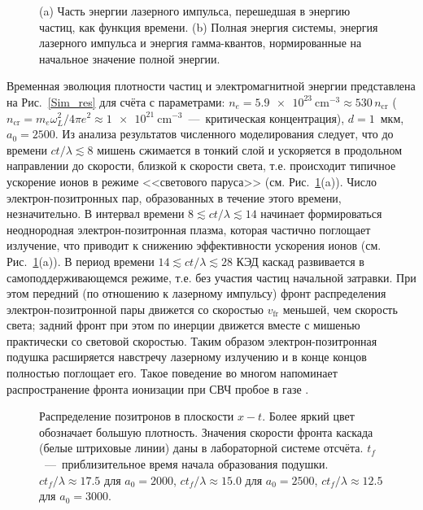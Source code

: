 \begin{figure}[h!]
	\caption[Баланс энергии в системе в численном моделировании с параметрами $n_{e}=\SI{5.9e23}{\centi\meter^{-3}}$, $d=1$~мкм, $a_{0}=2500$]{\label{Sim_en} (a) Часть энергии лазерного импульса, перешедшая в энергию частиц, как функция времени. (b) Полная энергия системы, энергия лазерного импульса и энергия гамма-квантов, нормированные на начальное значение полной энергии.}
\end{figure}

Временная эволюция плотности частиц и электромагнитной энергии представлена на Рис.~\ref{Sim_res} для счёта с параметрами: ${n_{e}=\SI{5.9e23}{\centi\meter^{-3}}\approx530\, n_\mathrm{cr}}$ (${n_\mathrm{cr}=m_{e}\omega_{L}^{2}/4\pi e^{2}\approx\SI{1e21}{\centi\meter^{-3}}}$~---~критическая концентрация), $d=1$~мкм, $a_{0}=2500$. 
Из анализа результатов численного моделирования следует, что до времени $ct/\lambda\lesssim 8$ мишень сжимается в тонкий слой и ускоряется в продольном направлении до скорости, близкой к скорости света, т.е. происходит типичное ускорение ионов в режиме <<светового паруса>> (см. Рис.~\ref{Sim_en}\;(a)). 
Число электрон-позитронных пар, образованных в течение этого времени, незначительно. В интервал времени $8 \lesssim ct/\lambda \lesssim 14$ начинает формироваться неоднородная электрон-позитронная плазма, которая частично поглощает излучение, что приводит к снижению эффективности ускорения ионов (см. Рис.~\ref{Sim_en}\;(a)).
В период времени $14 \lesssim ct/\lambda \lesssim 28$ КЭД каскад развивается в самоподдерживающемся режиме, т.е. без участия частиц начальной затравки. 
При этом передний (по отношению к лазерному импульсу) фронт распределения электрон-позитронной пары движется со скоростью $v_\mathrm{fr}$ меньшей, чем скорость света; задний фронт при этом по инерции движется вместе с мишенью практически со световой скоростью. 
Таким образом электрон-позитронная подушка расширяется навстречу лазерному излучению и в конце концов полностью поглощает его. 
Такое поведение во многом напоминает распространение фронта ионизации при СВЧ пробое в газе \cite{semenov1982breakdown}.

\begin{figure}[h!]
    \caption[Распределение позитронов в плоскости $x-t$ в численных моделированиях с различными начальными параметрами]{
        \label{fig:ch2/cushion-x-t}
        Распределение позитронов в плоскости $x-t$. Более яркий цвет обозначает большую плотность. Значения скорости фронта каскада (белые штриховые линии) даны в лабораторной системе отсчёта. $t_{f}$~---~приблизительное время начала образования подушки. $ct_{f}/\lambda\approx17.5$ для $a_{0}=2000$, $ct_{f}/\lambda\approx15.0$ для $a_{0}=2500$, $ct_{f}/\lambda\approx12.5$ для $a_{0}=3000$.}
\end{figure}

